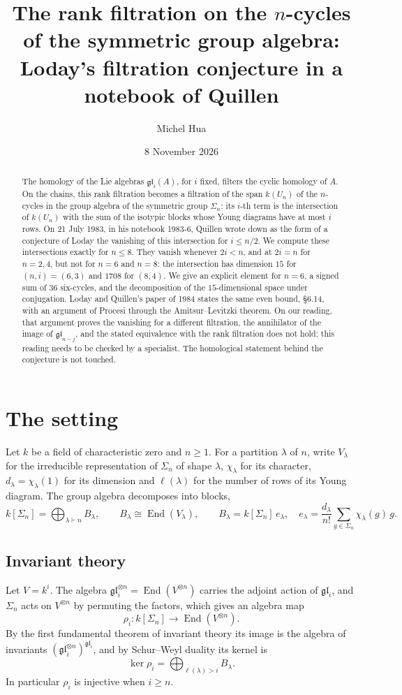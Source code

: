 \documentclass[11pt,a4paper]{amsart}
\title[The rank filtration on the $n$-cycles]{The rank filtration on the $n$-cycles\\ of the symmetric group algebra:\\ Loday's filtration conjecture in a notebook of Quillen}
\author{Michel Hua}
\date{8 November 2026}
\theoremstyle{definition}
\theoremstyle{remark}
\newcommand{\gl}{\mathfrak{gl}}
\newcommand{\End}{\operatorname{End}}
\begin{document}
\begin{abstract}
The homology of the Lie algebras $\gl_i(A)$, for $i$ fixed, filters the cyclic homology of $A$. On the chains, this rank filtration becomes a filtration of the span $k(U_n)$ of the $n$-cycles in the group algebra of the symmetric group $\Sigma_n$: its $i$-th term is the intersection of $k(U_n)$ with the sum of the isotypic blocks whose Young diagrams have at most $i$ rows. On 21 July 1983, in his notebook 1983-6, Quillen wrote down as the form of a conjecture of Loday the vanishing of this intersection for $i \le n/2$. We compute these intersections exactly for $n \le 8$. They vanish whenever $2i < n$, and at $2i = n$ for $n = 2, 4$, but not for $n = 6$ and $n = 8$: the intersection has dimension $15$ for $(n, i) = (6, 3)$ and $1708$ for $(8, 4)$. We give an explicit element for $n = 6$, a signed sum of $36$ six-cycles, and the decomposition of the $15$-dimensional space under conjugation. Loday and Quillen's paper of 1984 states the same even bound, \S6.14, with an argument of Procesi through the Amitsur--Levitzki theorem. On our reading, that argument proves the vanishing for a different filtration, the annihilator of the image of $\gl_{n-j}$, and the stated equivalence with the rank filtration does not hold; this reading needs to be checked by a specialist. The homological statement behind the conjecture is not touched.
\end{abstract}
\maketitle

\section{The setting}\label{sec:setting}

Let $k$ be a field of characteristic zero and $n \ge 1$. For a partition $\lambda$ of $n$, write $V_\lambda$ for the irreducible representation of $\Sigma_n$ of shape $\lambda$, $\chi_\lambda$ for its character, $d_\lambda = \chi_\lambda(1)$ for its dimension and $\ell(\lambda)$ for the number of rows of its Young diagram. The group algebra decomposes into blocks,
\[
k[\Sigma_n] = \bigoplus_{\lambda \vdash n} B_\lambda, \qquad B_\lambda \cong \End(V_\lambda), \qquad B_\lambda = k[\Sigma_n]\, e_\lambda, \quad e_\lambda = \frac{d_\lambda}{n!} \sum_{g \in \Sigma_n} \chi_\lambda(g)\, g .
\]

\subsection*{Invariant theory}
Let $V = k^i$. The algebra $\gl_i^{\otimes n} = \End(V^{\otimes n})$ carries the adjoint action of $\gl_i$, and $\Sigma_n$ acts on $V^{\otimes n}$ by permuting the factors, which gives an algebra map
\[
\rho_i \colon k[\Sigma_n] \to \End(V^{\otimes n}).
\]
By the first fundamental theorem of invariant theory its image is the algebra of invariants $(\gl_i^{\otimes n})^{\gl_i}$, and by Schur--Weyl duality its kernel is
\[
\ker \rho_i = \bigoplus_{\ell(\lambda) > i} B_\lambda .
\]
In particular $\rho_i$ is injective when $i \ge n$.
\end{document}
